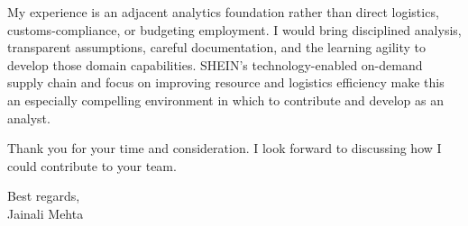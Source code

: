 \documentclass[letterpaper,10pt]{article}
\begin{document}
My experience is an adjacent analytics foundation rather than direct logistics, customs-compliance, or budgeting employment. I would bring disciplined analysis, transparent assumptions, careful documentation, and the learning agility to develop those domain capabilities. SHEIN's technology-enabled on-demand supply chain and focus on improving resource and logistics efficiency make this an especially compelling environment in which to contribute and develop as an analyst.

Thank you for your time and consideration. I look forward to discussing how I could contribute to your team.

Best regards,\\[8pt]
Jainali Mehta
\end{document}
